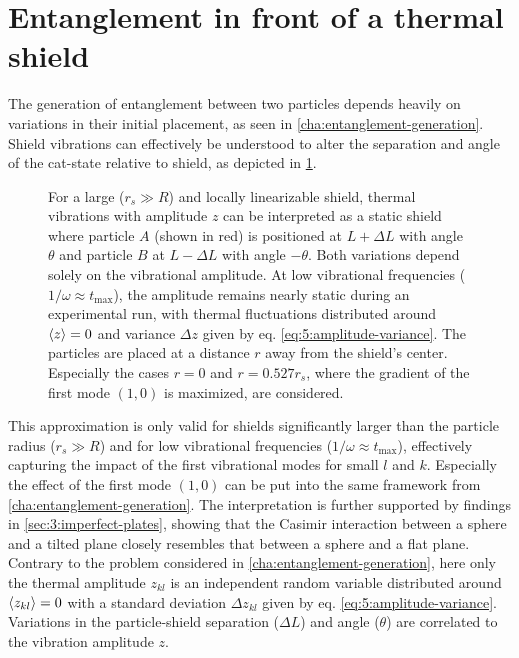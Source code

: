 \section{Entanglement in front of a thermal shield}\label{sec:5:thermal-entanglement}
The generation of entanglement between two particles depends heavily on variations in their initial placement, as seen in \cref{cha:entanglement-generation}.
Shield vibrations can effectively be understood to alter the separation and angle of the cat-state relative to shield, as depicted in \cref{fig:5:vibrating-translation-to-variations}.
\begin{figure}[!htbp]
  \centering
  \def\svgwidth{\textwidth}
  
  \caption{For a large ($r_s \gg R$) and locally linearizable shield, thermal vibrations with amplitude $z$ can be interpreted as a static shield where particle $A$ (shown in red) is positioned at $L+\Delta L$ with angle $\theta$ and particle $B$ at $L-\Delta L$ with angle $-\theta$. Both variations depend solely on the vibrational amplitude. At low vibrational frequencies ($1/\omega \approx t_\mathrm{max}$), the amplitude remains nearly static during an experimental run, with thermal fluctuations distributed around $\left\langle z\right\rangle=0$ and variance $\Delta z$ given by eq. \eqref{eq:5:amplitude-variance}. The particles are placed at a distance $r$ away from the shield's center. Especially the cases $r=0$ and $r=0.527r_s$, where the gradient of the first mode $(1,0)$ is maximized, are considered.}
  \label{fig:5:vibrating-translation-to-variations}
\end{figure}
This approximation is only valid for shields significantly larger than the particle radius ($r_s \gg R$) and for low vibrational frequencies ($1/\omega \approx t_\mathrm{max}$), effectively capturing the impact of the first vibrational modes for small $l$ and $k$.
Especially the effect of the first mode $(1,0)$ can be put into the same framework from \cref{cha:entanglement-generation}. 
The interpretation is further supported by findings in \cref{sec:3:imperfect-plates}, showing that the Casimir interaction between a sphere and a tilted plane closely resembles that between a sphere and a flat plane.
Contrary to the problem considered in \cref{cha:entanglement-generation}, here only the thermal amplitude $z_{kl}$ is an independent random variable distributed around $\left\langle z_{kl}\right\rangle=0$ with a standard deviation $\Delta z_{kl}$ given by eq. \eqref{eq:5:amplitude-variance}. 
Variations in the particle-shield separation ($\Delta L$) and angle ($\theta$) are correlated to the vibration amplitude $z$.
